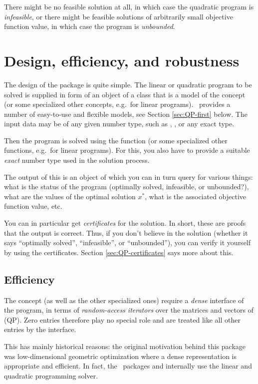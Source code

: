 There might be no feasible solution at all, in which
case the quadratic program is \emph{infeasible}, or there might be
feasible solutions of arbitrarily small objective function value, in
which case the program is \emph{unbounded}.  

\section{Design, efficiency, and robustness}
The design of the package is quite simple. The linear
or quadratic program to be solved is supplied in form of an object 
of a class that is a model of the concept  
(or some specialized other concepts, e.g.\ for linear programs). \cgal\
provides a number of easy-to-use and flexible models, see Section 
\ref{sec:QP-first} below. The input data may be of any given number 
type, such as \ccc{double}, \ccc{int}, or any exact type. 

Then the program is solved using the function 
(or some specialized other functions, e.g.\ for linear programs). For this,
you also have to provide a suitable \emph{exact} number type \ccc{ET} used
in the solution process.

The output of this is an object of 
which you can in turn query for various things: what is the status of 
the program (optimally solved, infeasible, or unbounded?), what are 
the values of the optimal solution $x^*$, what is the associated
objective function value, etc. 

You can in particular get \emph{certificates} for the solution. In short,
these are proofs that the output is correct. Thus, if you don't believe 
in the solution (whether it says ``optimally solved'', ``infeasible'', 
or ``unbounded''), you can verify it yourself by using the certificates.
Section \ref{sec:QP-certificates} says more about this.

\subsection{Efficiency}
The concept  (as well as the
other specialized ones) require a \emph{dense} interface 
of the program, in terms of \emph{random-access iterators} over 
the matrices and vectors of (QP). Zero entries therefore play no
special role and are treated like all other entries by the
interface.  

This has mainly historical
reasons: the original motivation behind this package was 
low-dimensional geometric optimization where 
a dense representation is appropriate and efficient. In fact, 
the \cgal\ packages  and
 internally use the linear 
and quadratic programming solver. 

